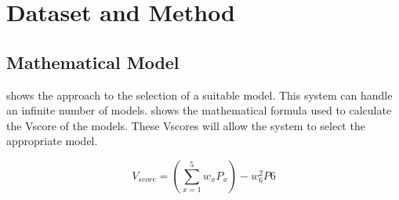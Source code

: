 \section{Dataset and Method} \label{sec:dataset_and_method}

\subsection{Mathematical Model}\label{subsec:mathematical_model}

 shows the approach to the selection of a suitable model. This system can handle an infinite number of models.  shows the mathematical formula used to calculate the Vscore of the models. These Vscores will allow the system to select the appropriate model.

\begin{equation}\label{eq:v_score}
    V_{score} = \left(\sum_{x=1}^{5} w_xP_x\right) - w_6^2P6
\end{equation}

